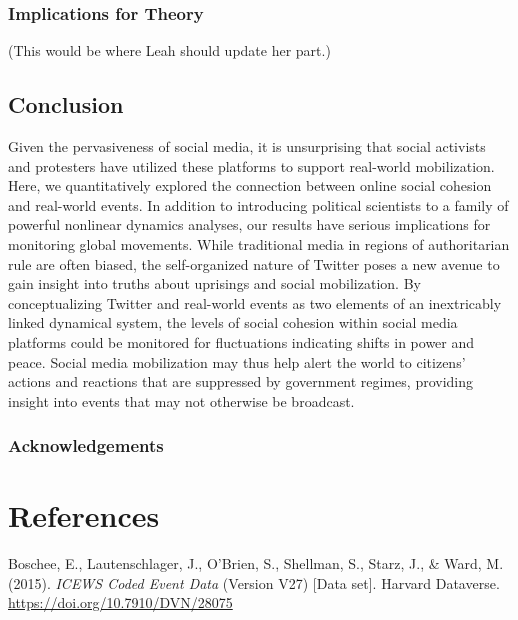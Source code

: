 \documentclass[english,man]{apa6}
\begin{document}
\hypertarget{implications-for-theory}{%
\subsubsection{Implications for Theory}\label{implications-for-theory}}

(This would be where Leah should update her part.)

\hypertarget{conclusion}{%
\subsection{Conclusion}\label{conclusion}}

Given the pervasiveness of social media, it is unsurprising
that social activists and protesters have
utilized these platforms to support real-world mobilization.
Here, we quantitatively explored the connection
between online social cohesion and real-world events. In addition
to introducing political scientists to a family of powerful nonlinear
dynamics analyses, our results have serious implications for monitoring global
movements. While traditional media in regions of authoritarian rule are
often biased, the self-organized nature of Twitter poses a new avenue to gain
insight into truths about uprisings and social mobilization. By
conceptualizing Twitter and real-world events as two elements of an
inextricably linked dynamical system, the levels of social cohesion within
social media platforms could be monitored for fluctuations indicating shifts
in power and peace. Social media mobilization may thus help alert the world to
citizens' actions and reactions that are suppressed by government regimes,
providing insight into events that may not otherwise be broadcast.

\hypertarget{acknowledgements}{%
\subsubsection{Acknowledgements}\label{acknowledgements}}

\newpage

\hypertarget{references}{%
\section{References}\label{references}}

\begingroup
\setlength{\parindent}{-0.5in}
\setlength{\leftskip}{0.5in}

\hypertarget{refs}{}
\leavevmode\hypertarget{ref-DVNux2f28075_2015}{}%
Boschee, E., Lautenschlager, J., O'Brien, S., Shellman, S., Starz, J., \& Ward, M. (2015). \emph{ICEWS Coded Event Data} (Version V27) {[}Data set{]}. Harvard Dataverse. \url{https://doi.org/10.7910/DVN/28075}
\end{document}
